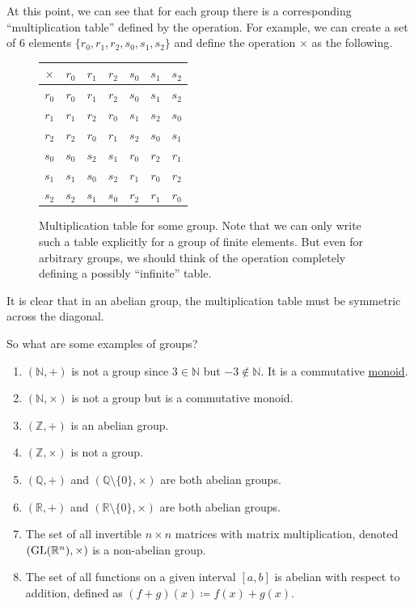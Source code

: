   At this point, we can see that for each group there is a corresponding ``multiplication table'' defined by the operation. For example, we can create a set of $6$ elements $\{r_0, r_1, r_2, s_0, s_1, s_2\}$ and define the operation $\times$ as the following. 

  \begin{figure}[H]
    \centering 
    \begin{tabular}{c|cccccc}
      $\times$ & $r_0$ & $r_1$ & $r_2$ & $s_0$ & $s_1$ & $s_2$ \\
      \hline
      $r_0$ & $r_0$ & $r_1$ & $r_2$ & $s_0$ & $s_1$ & $s_2$ \\
      $r_1$ & $r_1$ & $r_2$ & $r_0$ & $s_1$ & $s_2$ & $s_0$ \\
      $r_2$ & $r_2$ & $r_0$ & $r_1$ & $s_2$ & $s_0$ & $s_1$ \\
      $s_0$ & $s_0$ & $s_2$ & $s_1$ & $r_0$ & $r_2$ & $r_1$ \\
      $s_1$ & $s_1$ & $s_0$ & $s_2$ & $r_1$ & $r_0$ & $r_2$ \\
      $s_2$ & $s_2$ & $s_1$ & $s_0$ & $r_2$ & $r_1$ & $r_0$ \\
    \end{tabular}
    \caption{Multiplication table for some group. Note that we can only write such a table explicitly for a group of finite elements. But even for arbitrary groups, we should think of the operation completely defining a possibly ``infinite'' table.} 
  \end{figure} 

  It is clear that in an abelian group, the multiplication table must be symmetric across the diagonal. 

  \begin{example}
    \label{ex:familiar-groups}
    So what are some examples of groups? 
    \begin{enumerate}
      \item $(\mathbb{N}, +)$ is not a group since $3 \in \mathbb{N}$ but $-3 \not\in \mathbb{N}$. It is a commutative \hyperref[def:monoid]{monoid}. 
      \item $(\mathbb{N}, \times)$ is not a group but is a commutative monoid. 
      \item $(\mathbb{Z}, +)$ is an abelian group. 
      \item $(\mathbb{Z}, \times)$ is not a group. 
      \item $(\mathbb{Q}, +)$ and $(\mathbb{Q} \setminus \{0\}, \times)$ are both abelian groups. 
      \item $(\mathbb{R}, +)$ and $(\mathbb{R} \setminus \{0\}, \times)$ are both abelian groups. 
      \item The set of all invertible $n \times n$ matrices with matrix multiplication, denoted $(\operatorname{GL} (\mathbb{R}^n), \times)$ is a non-abelian group. 
      \item The set of all functions on a given interval $[a,b]$ is abelian with respect to addition, defined as $(f+g)(x) \coloneqq f(x) + g(x)$. 
    \end{enumerate}
  \end{example}

